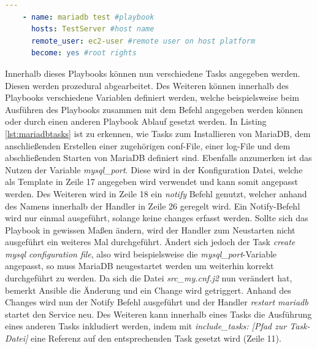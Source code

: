 \documentclass[biblatex]{lni}
\begin{document}
\begin{lstlisting}[language=yaml, caption={Beschreibung eines Playbooks mit dem Namen \textit{mariadb test}}, label=lst:mariadbpb]
    ---
    - name: mariadb test #playbook
      hosts: TestServer #host name
      remote_user: ec2-user #remote user on host platform
      become: yes #root rights
\end{lstlisting}

Innerhalb dieses Playbooks können nun verschiedene Tasks angegeben werden. Diesen werden prozedural abgearbeitet. Des Weiteren können innerhalb des Playbooks verschiedene Variablen definiert werden, welche beispielsweise beim Ausführen des Playbooks zusammen mit dem Befehl angegeben werden können oder durch einen anderen Playbook Ablauf gesetzt werden. In Listing \ref{lst:mariadbtasks} ist zu erkennen, wie Tasks zum Installieren von MariaDB, dem anschließenden Erstellen einer zugehörigen conf-File, einer log-File und dem abschließenden Starten von MariaDB definiert sind. Ebenfalls anzumerken ist das Nutzen der Variable \textit{mysql\_port}. Diese wird in der Konfiguration Datei, welche als Template in Zeile 17 angegeben wird verwendet und kann somit angepasst werden. Des Weiteren wird in Zeile 18 ein \textit{notify} Befehl genutzt, welcher anhand des Namens innerhalb der Handler in Zeile 26 geregelt wird. Ein Notify-Befehl wird nur einmal ausgeführt, solange keine changes erfasst werden. Sollte sich das Playbook  in gewissen Maßen ändern, wird der Handler zum Neustarten nicht ausgeführt ein weiteres Mal durchgeführt. Ändert sich jedoch der Task \textit{create mysql configuration file}, also wird beispielsweise die \textit{mysql\_port}-Variable angepasst, so muss MariaDB neugestartet werden um weiterhin korrekt durchgeführt zu werden. Da sich die Datei \textit{src\_my.cnf.j2} nun verändert hat, bemerkt Ansible die Änderung und ein Change wird getriggert. Anhand des Changes wird nun der Notify Befehl ausgeführt und der Handler \textit{restart mariadb} startet den Service neu.  Des Weiteren kann innerhalb eines Tasks die Ausführung eines anderen Tasks inkludiert werden, indem mit \textit{include\_tasks: [Pfad zur Task-Datei]} eine Referenz auf den entsprechenden Task gesetzt wird (Zeile 11).
\end{document}
